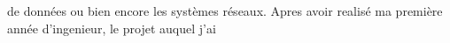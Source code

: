 \documentclass[a4paper, 11pt, french]{report}
\begin{document}
                                                                                                                        de
                                                                                                                        données
                                                                                                                        ou
                                                                                                                        bien
                                                                                                                        encore
                                                                                                                        les
                                                                                                                        systèmes
                                                                                                                        réseaux.
                                                                                                                        \newline
                                                                                                                            Apres
                                                                                                                            avoir
                                                                                                                            realisé
                                                                                                                            ma
                                                                                                                            première
                                                                                                                            année
                                                                                                                            d'ingenieur,
                                                                                                                            le
                                                                                                                            projet
                                                                                                                            auquel
                                                                                                                            j'ai
\end{document}
